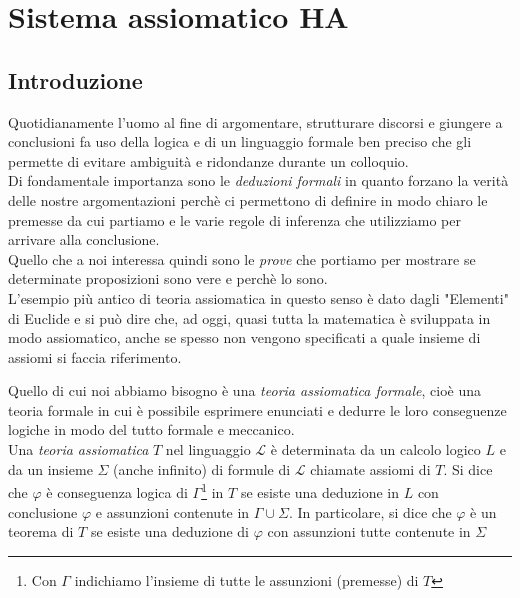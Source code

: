 \chapter{Sistema assiomatico HA}
\section{Introduzione}

Quotidianamente l'uomo al fine di argomentare, strutturare discorsi e giungere a conclusioni fa uso della logica e di un linguaggio formale ben preciso che gli permette di evitare ambiguit\`a e ridondanze durante un colloquio.\\
Di fondamentale importanza sono le \emph{deduzioni formali} in quanto forzano la verit\`a delle nostre argomentazioni perch\`e ci permettono di definire in modo chiaro le premesse da cui partiamo e le varie regole di inferenza che utilizziamo per arrivare alla conclusione.\\
Quello che a noi interessa quindi sono le \emph{prove} che portiamo per mostrare se determinate proposizioni sono vere e perch\`e lo sono.\\
L'esempio pi\`u antico di teoria assiomatica in questo senso \`e dato dagli "Elementi" di Euclide e si pu\`o dire che, ad oggi, quasi tutta la matematica \`e sviluppata in modo assiomatico, anche se spesso non vengono specificati a quale insieme di assiomi si faccia riferimento.

Quello di cui noi abbiamo bisogno \`e una \emph{teoria assiomatica formale}, cio\`e  una teoria formale in cui \`e possibile esprimere enunciati e dedurre le loro conseguenze logiche in modo del tutto formale e meccanico.\\

Una \emph{teoria assiomatica} $T$ nel linguaggio $\mathcal{L}$ \`e determinata da un calcolo logico $L$ e da un insieme $\Sigma$ (anche infinito) di formule di $\mathcal{L}$ chiamate assiomi di $T$. Si dice che $\varphi$ \`e conseguenza logica di $\Gamma$\footnote{Con $\Gamma$ indichiamo l'insieme di tutte le assunzioni (premesse) di $T$} in $T$ se esiste una deduzione in $L$ con conclusione $\varphi$ e assunzioni contenute in $\Gamma \cup \Sigma$. In particolare, si dice che $\varphi$ \`e un teorema di $T$ se esiste una deduzione di $\varphi$ con assunzioni tutte contenute in $\Sigma$


